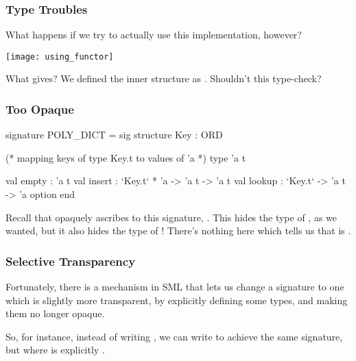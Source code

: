 \documentclass[aspectratio=169, handout]{beamer}
\begin{document}
\begin{frame}[fragile]
  \frametitle{Type Troubles}

  What happens if we try to actually use this implementation, however?

  \pause
  \vspace{\fill}

  \begin{mdframed}[leftmargin=0.5cm, roundcorner=10pt, backgroundcolor=black!86!white, rightmargin=0.5cm]
  \begin{center}
  \texttt{[image: using\_functor]}
  \end{center}
  \end{mdframed}

  \pause
  \vspace{\fill}

  What gives? We defined the inner  structure as . Shouldn't
  this type-check?
\end{frame}

\begin{frame}[fragile]
  \frametitle{Too Opaque}
  {\small
  \begin{codeblock}
    signature POLY_DICT =
      sig
        structure Key : ORD

        (* mapping keys of type Key.t to values of 'a *)
        type 'a t

        val empty : 'a t
        val insert : `Key.t` * 'a -> 'a t -> 'a t
        val lookup : `Key.t` -> 'a t -> 'a option
      end
  \end{codeblock}
  }

  \pause
  \vspace{\fill}

  Recall that  opaquely ascribes to this signature, . This hides the
  type of , as we wanted, but it also hides the type of ! There's nothing
  here which tells us that  is .
\end{frame}

\begin{frame}[fragile]
  \frametitle{Selective Transparency}

  Fortunately, there is a mechanism in SML that lets us change a signature to one which
  is slightly more transparent, by explicitly defining some types, and making them no longer
  opaque.

  \pause
  \vspace{\fill}


  \pause
  \vspace{\fill}

  So, for instance, instead of writing , we can write 
  to achieve the same signature, but where  is explicitly .
\end{frame}
\end{document}
